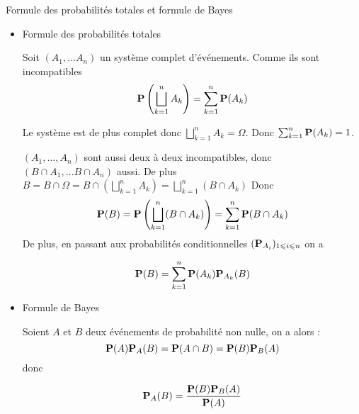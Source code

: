 \documentclass{article}
\begin{document}
\begin{question_kholle}{Formule des probabilités totales et formule de Bayes}
	\begin{itemize}
		\item Formule des probabilités totales
		
		Soit $(A_{1}, \dots A_{n})$ un système complet d'événements.
		Comme ils sont incompatibles
		$$\mathbf P\left( \bigsqcup_{k=1}^{n} A_{k} \right)= \sum_{k=1}^{n}\mathbf P(A_{k})$$
		
		Le système est de plus complet donc $\bigsqcup _{k=1}^{n} A_{k} = \Omega$. Donc $\sum_{k=1}^{n}\mathbf P(A_{k}) = 1$.
		
		$(A_{1}, \dots , A_{n})$ sont aussi deux à deux incompatibles, donc $(B \cap A_{1}, \dots B \cap A_{n})$ aussi.
		De plus $B = B \cap \Omega = B \cap \left( \bigsqcup_{k=1}^{n}A_{k} \right) = \bigsqcup_{k=1}^{n}(B \cap A_{k})$
		Donc
		$$\mathbf P(B)= \mathbf P\left( \bigsqcup_{k=1}^{n}(B \cap A_{k}) \right) = \sum_{k=1}^{n}\mathbf P(B \cap A_{k})$$
		De plus, en passant aux probabilités conditionnelles $(\mathbf P_{A_{i}})_{1\leqslant i\leqslant n}$ on a 
		
		$$\mathbf P(B) = \sum_{k=1}^{n}\mathbf P(A_{k})\mathbf P_{A_{k}}(B)$$
		
		\item Formule de Bayes
		
		Soient $A$ et $B$ deux événements de probabilité non nulle, on a alors :
		$$\mathbf P(A)\mathbf P_{A}(B) = \mathbf P(A \cap B) = \mathbf P(B)\mathbf P_{B}(A)$$
		donc
		
		$$\mathbf P_{A}(B) = \frac{\mathbf P(B)\mathbf P_{B}(A)}{\mathbf P(A)}$$
	\end{itemize}
\end{question_kholle}
\end{document}
